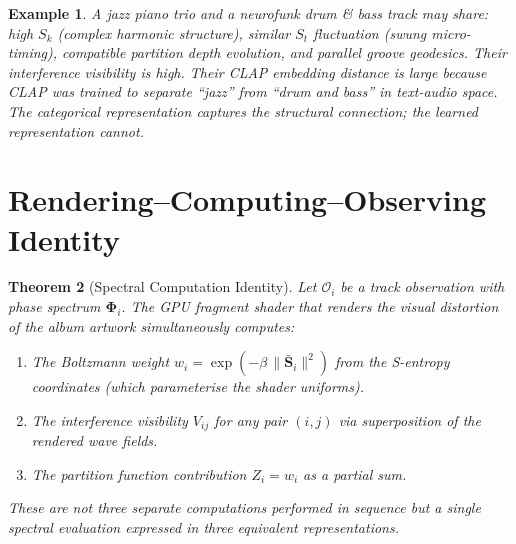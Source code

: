 \documentclass[11pt,twocolumn,a4paper]{article}
\newtheorem{theorem}{Theorem}[section]
\newtheorem{example}[theorem]{Example}
\newcommand{\Sk}{S_k}
\newcommand{\St}{S_t}
\newcommand{\Spec}{\bm{\Phi}}
\begin{document}
\begin{example}
A jazz piano trio and a neurofunk drum \& bass track may share: high
$\Sk$ (complex harmonic structure), similar $\St$ fluctuation (swung
micro-timing), compatible partition depth evolution, and parallel groove
geodesics. Their interference visibility is high. Their CLAP embedding
distance is large because CLAP was trained to separate ``jazz'' from
``drum and bass'' in text-audio space. The categorical representation
captures the structural connection; the learned representation cannot.
\end{example}


\section{Rendering--Computing--Observing Identity}
\label{sec:rco}

\begin{theorem}[Spectral Computation Identity]
\label{thm:rco}
Let $\mathcal{O}_i$ be a track observation with phase spectrum
$\Spec_i$. The GPU fragment shader that renders the visual distortion
of the album artwork simultaneously computes:
\begin{enumerate}[label=(\roman*),leftmargin=*]
\item The Boltzmann weight $w_i = \exp(-\beta\,
  \|\bar{\mathbf{S}}_i\|^2)$ from the S-entropy coordinates (which
  parameterise the shader uniforms).
\item The interference visibility $V_{ij}$ for any pair $(i, j)$ via
  superposition of the rendered wave fields.
\item The partition function contribution $Z_i = w_i$ as a partial
  sum.
\end{enumerate}
These are not three separate computations performed in sequence but a
single spectral evaluation expressed in three equivalent
representations.
\end{theorem}
\end{document}
